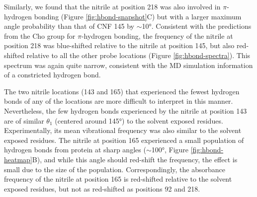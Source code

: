 Similarly, we found that the nitrile at position 218 was also involved in $\pi$-hydrogen bonding (Figure \ref{fig:hbond-snapshot}C) but with a larger maximum angle probability than that of CNF 145 by $\sim$\ang{10}.
Consistent with the predictions from the Cho group for $\pi$-hydrogen bonding, the frequency of the nitrile at position 218 was blue-shifted relative to the nitrile at position 145, but also red-shifted relative to all the other probe locations (Figure \ref{fig:hbond-spectra}).
This spectrum was again quite narrow, consistent with the MD simulation information of a constricted hydrogen bond. 

The two nitrile locations (143 and 165) that experienced the fewest hydrogen bonds of any of the locations are more difficult to interpret in this manner.
Nevertheless, the few hydrogen bonds experienced by the nitrile at position 143 are of similar $\theta_1$ (centered around \ang{145}) to the solvent exposed residues.
Experimentally, its mean vibrational frequency was also similar to the solvent exposed residues.
The nitrile at position 165 experienced a small population of hydrogen bonds from protein at sharp angles ($\sim$\ang{100}, Figure \ref{fig:hbond-heatmap}B), and while this angle should red-shift the frequency, the effect is small due to the size of the population.
Correspondingly, the absorbance frequency of the nitrile at position 165 is red-shifted relative to the solvent exposed residues, but not as red-shifted as positions 92 and 218. 

